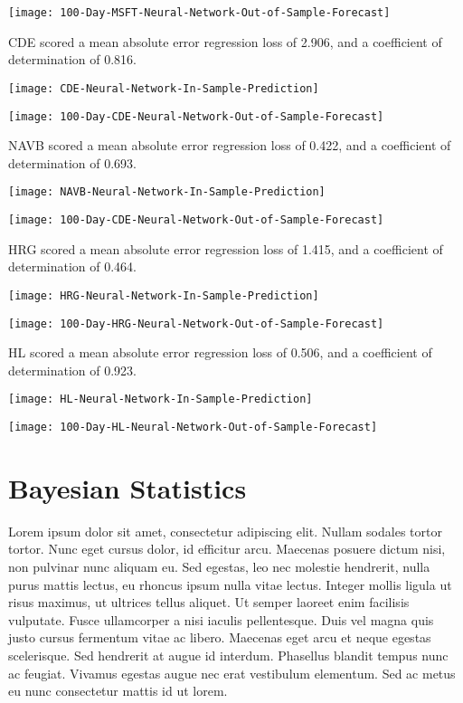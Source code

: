 \texttt{[image: 100-Day-MSFT-Neural-Network-Out-of-Sample-Forecast]}

CDE scored a mean absolute error regression loss of 2.906, and a coefficient of determination of 0.816.

\texttt{[image: CDE-Neural-Network-In-Sample-Prediction]}

\texttt{[image: 100-Day-CDE-Neural-Network-Out-of-Sample-Forecast]}

NAVB scored a mean absolute error regression loss of 0.422, and a coefficient of determination of 0.693.

\texttt{[image: NAVB-Neural-Network-In-Sample-Prediction]}

\texttt{[image: 100-Day-CDE-Neural-Network-Out-of-Sample-Forecast]}

HRG scored a mean absolute error regression loss of 1.415, and a coefficient of determination of 0.464.

\texttt{[image: HRG-Neural-Network-In-Sample-Prediction]}

\texttt{[image: 100-Day-HRG-Neural-Network-Out-of-Sample-Forecast]}

HL scored a mean absolute error regression loss of 0.506, and a coefficient of determination of 0.923.

\texttt{[image: HL-Neural-Network-In-Sample-Prediction]}

\texttt{[image: 100-Day-HL-Neural-Network-Out-of-Sample-Forecast]}

\section{Bayesian Statistics}
Lorem ipsum dolor sit amet, consectetur adipiscing elit. Nullam sodales tortor tortor. Nunc eget cursus dolor, id efficitur arcu. Maecenas posuere dictum nisi, non pulvinar nunc aliquam eu. Sed egestas, leo nec molestie hendrerit, nulla purus mattis lectus, eu rhoncus ipsum nulla vitae lectus. Integer mollis ligula ut risus maximus, ut ultrices tellus aliquet. Ut semper laoreet enim facilisis vulputate. Fusce ullamcorper a nisi iaculis pellentesque. Duis vel magna quis justo cursus fermentum vitae ac libero. Maecenas eget arcu et neque egestas scelerisque. Sed hendrerit at augue id interdum. Phasellus blandit tempus nunc ac feugiat. Vivamus egestas augue nec erat vestibulum elementum. Sed ac metus eu nunc consectetur mattis id ut lorem.

